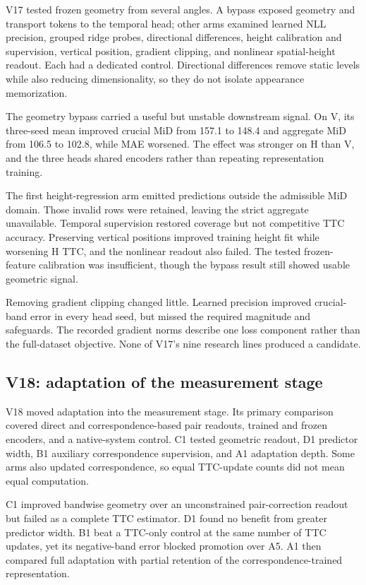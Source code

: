 V17 tested frozen geometry from several angles. A bypass exposed geometry and transport tokens to the temporal head; other arms examined learned NLL precision, grouped ridge probes, directional differences, height calibration and supervision, vertical position, gradient clipping, and nonlinear spatial-height readout. Each had a dedicated control. Directional differences remove static levels while also reducing dimensionality, so they do not isolate appearance memorization.

The geometry bypass carried a useful but unstable downstream signal. On V, its three-seed mean improved crucial MiD from 157.1 to 148.4 and aggregate MiD from 106.5 to 102.8, while MAE worsened. The effect was stronger on H than V, and the three heads shared encoders rather than repeating representation training.

The first height-regression arm emitted predictions outside the admissible MiD domain. Those invalid rows were retained, leaving the strict aggregate unavailable. Temporal supervision restored coverage but not competitive TTC accuracy. Preserving vertical positions improved training height fit while worsening H TTC, and the nonlinear readout also failed. The tested frozen-feature calibration was insufficient, though the bypass result still showed usable geometric signal.

Removing gradient clipping changed little. Learned precision improved crucial-band error in every head seed, but missed the required magnitude and safeguards. The recorded gradient norms describe one loss component rather than the full-dataset objective. None of V17's nine research lines produced a candidate. 

\subsection{V18: adaptation of the measurement stage}

V18 moved adaptation into the measurement stage. Its primary comparison covered direct and correspondence-based pair readouts, trained and frozen encoders, and a native-system control. C1 tested geometric readout, D1 predictor width, B1 auxiliary correspondence supervision, and A1 adaptation depth. Some arms also updated correspondence, so equal TTC-update counts did not mean equal computation.

C1 improved bandwise geometry over an unconstrained pair-correction readout but failed as a complete TTC estimator. D1 found no benefit from greater predictor width. B1 beat a TTC-only control at the same number of TTC updates, yet its negative-band error blocked promotion over A5. A1 then compared full adaptation with partial retention of the correspondence-trained representation.

